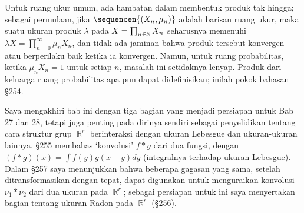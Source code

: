 Untuk ruang ukur umum, ada hambatan dalam membentuk produk tak hingga; sebagai
permulaan, jika $\sequencen{(X_n,\mu_n)}$ adalah barisan ruang ukur, maka
suatu ukuran produk $\lambda$ pada $X=\prod_{n\in\Bbb N}X_n$ seharusnya
memenuhi $\lambda X=\prod_{n=0}^{\infty}\mu_nX_n$, dan tidak ada jaminan
bahwa produk tersebut konvergen atau berperilaku baik ketika ia konvergen.
Namun, untuk ruang probabilitas, ketika $\mu_nX_n=1$ untuk setiap $n$,
masalah ini setidaknya lenyap. Produk dari keluarga ruang probabilitas apa
pun dapat didefinisikan; inilah pokok bahasan \S254.

Saya mengakhiri bab ini dengan tiga bagian yang menjadi persiapan untuk Bab
27 dan 28, tetapi juga penting pada dirinya sendiri sebagai penyelidikan
tentang cara struktur grup $\BbbR^r$ berinteraksi dengan ukuran Lebesgue dan
ukuran-ukuran lainnya. \S255 membahas `konvolusi' $f*g$ dari dua fungsi,
dengan $(f*g)(x)=\int f(y)g(x-y)dy$ (integralnya terhadap ukuran Lebesgue).
Dalam \S257 saya menunjukkan bahwa beberapa gagasan yang sama, setelah
ditransformasikan dengan tepat, dapat digunakan untuk menguraikan konvolusi
$\nu_1*\nu_2$ dari dua ukuran pada $\BbbR^r$; sebagai persiapan untuk ini
saya menyertakan bagian tentang ukuran Radon pada $\BbbR^r$ (\S256).

\discrpage
